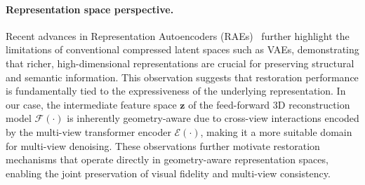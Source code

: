 \documentclass{llmxive}
\begin{document}
\paragraph{Representation space perspective.}
Recent advances in Representation Autoencoders (RAEs)~\cite{zheng2025diffusion, tong2026scaling, kumar2026learning} further highlight the limitations of conventional compressed latent spaces such as VAEs, demonstrating that richer, high-dimensional representations are crucial for preserving structural and semantic information. This observation suggests that restoration performance is fundamentally tied to the expressiveness of the underlying representation. In our case, the intermediate feature space $\mathbf{z}$ of the feed-forward 3D reconstruction model $\mathcal{F}(\cdot)$ is inherently geometry-aware due to cross-view interactions encoded by the multi-view transformer encoder $\mathcal{E}(\cdot)$, making it a more suitable domain for multi-view denoising. These observations further motivate restoration mechanisms that operate directly in geometry-aware representation spaces, enabling the joint preservation of visual fidelity and multi-view consistency.
\end{document}
